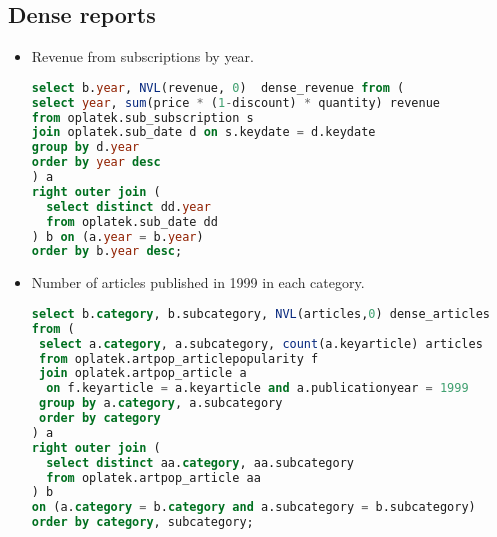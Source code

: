 \subsection{Dense reports} %
\label{sub:Dense reports}
\begin{itemize}
\item Revenue from subscriptions by year.
\begin{lstlisting}[language=sql] 
select b.year, NVL(revenue, 0)  dense_revenue from (
select year, sum(price * (1-discount) * quantity) revenue 
from oplatek.sub_subscription s 
join oplatek.sub_date d on s.keydate = d.keydate 
group by d.year 
order by year desc
) a
right outer join (
  select distinct dd.year
  from oplatek.sub_date dd
) b on (a.year = b.year)
order by b.year desc;
\end{lstlisting}

\item Number of articles published in 1999 in each category.
\begin{lstlisting}[language=sql] 
select b.category, b.subcategory, NVL(articles,0) dense_articles 
from (
 select a.category, a.subcategory, count(a.keyarticle) articles
 from oplatek.artpop_articlepopularity f
 join oplatek.artpop_article a 
  on f.keyarticle = a.keyarticle and a.publicationyear = 1999
 group by a.category, a.subcategory
 order by category
) a
right outer join (
  select distinct aa.category, aa.subcategory
  from oplatek.artpop_article aa
) b 
on (a.category = b.category and a.subcategory = b.subcategory)
order by category, subcategory;
\end{lstlisting}
\end{itemize}

